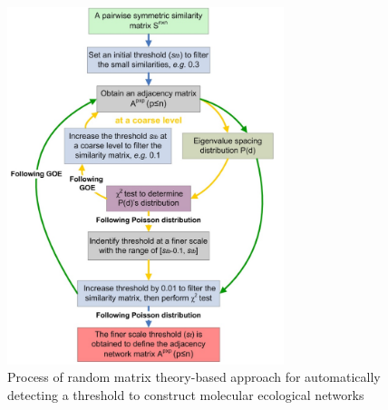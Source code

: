 \begin{figure}[H]
    \centering
    \includegraphics[width=0.72\textwidth]{Process of random matrix theory-based approach for automatically detecting threshold to construct molecular ecological networks} %
    \caption{Process of random matrix theory-based approach for automatically detecting a threshold to construct molecular ecological networks\cite{deng_molecular_2012}}
    \label{fig:Process_of_random_matrix_theory-based_approach_for_automatically_detecting_threshold_to_construct_molecular_ecological_networks}
\end{figure}

